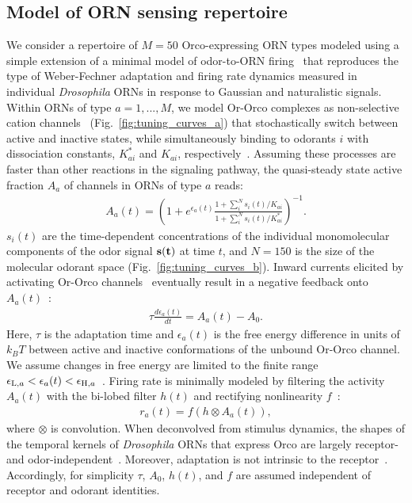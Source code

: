 \documentclass[10pt,prl,aps,showpacs,twocolumn,unsortedaddress]{revtex4-1}
\begin{document}
\subsection*{Model of ORN sensing repertoire}

We consider a repertoire of $M=50$ Orco-expressing ORN types modeled using a simple extension of a minimal model of odor-to-ORN firing~\cite{srinivas_elife} that reproduces the type of Weber-Fechner adaptation and firing rate dynamics measured in individual \textit{Drosophila} ORNs in response to Gaussian and naturalistic signals. Within ORNs of type $a=1,...,M$, we model Or-Orco complexes as non-selective cation channels~\cite{orco_structure} (Fig.~\ref{fig:tuning_curves_a}) that stochastically switch between active and inactive states, while simultaneously binding to odorants $i$ with dissociation constants, $K^*_{ai}$ and $K_{ai}$, respectively~\cite{nagel_wilson_biophysical,srinivas_elife}. Assuming these processes are faster than other reactions in the signaling pathway, the quasi-steady state active fraction $A_a$ of channels in ORNs of type $a$ reads:
\begin{align}
A_a(t) = \left(1 + e^{\epsilon_a(t)}\frac{1 + \sum_i^N s_i(t)/K_{ai}}{1 + \sum_i^N s_i(t)/K^*_{ai}}\right)^{-1}.
\label{eq:steady_state_act_OR}
\end{align}
$s_i(t)$ are the time-dependent concentrations of the individual monomolecular components of the odor signal $\bf{s}(t)$ at time $t$, and $N=150$ is the size of the molecular odorant space (Fig.~\ref{fig:tuning_curves_b}). Inward currents elicited by activating Or-Orco channels~\cite{orco_structure} eventually result in a negative feedback onto $A_a(t)$~\cite{nagel_wilson_biophysical,srinivas_elife,cao_WL}:
\begin{align}
\tau\frac{d\epsilon_a(t)}{dt} = {A}_{a}(t) - A_0.
\label{eq:adaptation_dynamics}
\end{align}
Here, $\tau$ is the adaptation time and $\epsilon_a(t)$ is the free energy difference in units of $k_B T$ between active and inactive conformations of the unbound Or-Orco channel. We assume changes in free energy are limited to the finite range $\epsilon_{\textup{L}, a} < \epsilon_a(t) < \epsilon_{\textup{H}, a}$~\cite{srinivas_elife}. Firing rate is minimally modeled by filtering the activity $A_a(t)$ with the bi-lobed filter $h(t)$ and rectifying nonlinearity $f$~\cite{srinivas_elife}:
\begin{align}
r_a(t)=f\left(h\otimes A_a(t)\right),
\label{eq:firing_machinery}
\end{align}
where $\otimes$ is convolution. When deconvolved from stimulus dynamics, the shapes of the temporal kernels of \textit{Drosophila} ORNs that express Orco are largely receptor- and odor-independent~\cite{martelli,srinivas_elife,si2017invariances}. Moreover, adaptation is not intrinsic to the receptor~\cite{nagel_wilson_biophysical}. Accordingly, for simplicity $\tau$, $A_0$, $h(t)$, and $f$ are assumed independent of receptor and odorant identities. 
\end{document}
